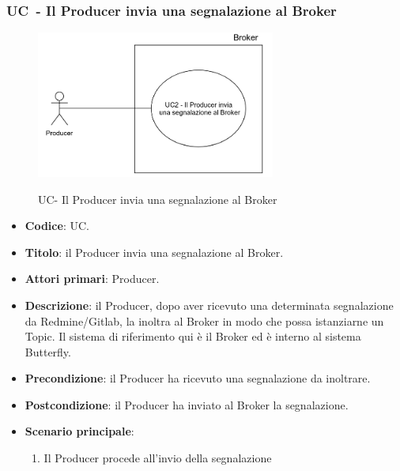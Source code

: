 \subsubsection{UC\theuccount\ - Il Producer invia una segnalazione al Broker}
	\begin{figure}[H]
		\centering
		\includegraphics[width=0.7\textwidth]{img/UC2-ProducerBroker.png}\\
		\caption{UC\theuccount - Il Producer invia una segnalazione al Broker}
	\end{figure}
	\begin{itemize}
		\item \textbf{Codice}: UC\theuccount.
		\item \textbf{Titolo}: il Producer invia una segnalazione al Broker.
		\item \textbf{Attori primari}: Producer.
		\item \textbf{Descrizione}: il Producer, dopo aver ricevuto una determinata segnalazione da Redmine/Gitlab, la inoltra al Broker in modo che possa istanziarne un Topic. Il sistema di riferimento qui è il Broker ed è interno al sistema Butterfly.
		\item \textbf{Precondizione}: il Producer ha ricevuto una segnalazione da inoltrare.
		\item \textbf{Postcondizione}: il Producer ha inviato al Broker la segnalazione.
		\item \textbf{Scenario principale}:
		\begin{enumerate}
			\item Il Producer procede all'invio della segnalazione
		\end{enumerate}
		 
	\end{itemize}


